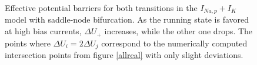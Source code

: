 \documentclass[12pt,a4paper]{article}
\begin{document}
\begin{figure}[H]
\hspace*{-0.5cm}
\caption{Effective potential barriers for both transitions in the $I_{Na,p}+I_K$ model with saddle-node bifurcation. As the running state is favored at high bias currents, $\Delta U_+$ increases, while the other one drops. The points where $\Delta U_i=2\Delta U_j$ correspond to the numerically computed intersection points from figure \ref{allreal} with only slight deviations.}\label{neubarrall}
\end{figure}
\end{document}
